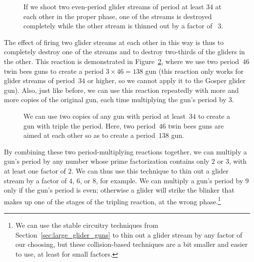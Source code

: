 \begin{figure}[!htb]
	\centering
	\caption{If we shoot two even-period glider streams of period at least $34$ at each other in the proper phase, one of the streams is destroyed completely while the other stream is thinned out by a factor of ~$3$.}\label{fig:glider_delete2}
\end{figure}

The effect of firing two glider streams at each other in this way is thus to completely destroy one of the streams and to destroy two-thirds of the gliders in the other. This reaction is demonstrated in Figure~\ref{fig:p138_gun}, where we use two period~$46$ twin bees guns to create a period $3 \times 46 = 138$ gun (this reaction only works for glider streams of period~$34$ or higher, so we cannot apply it to the Gosper glider gun). Also, just like before, we can use this reaction repeatedly with more and more copies of the original gun, each time multiplying the gun's period by $3$.

\begin{figure}[!htb]
	\centering
	\caption{We can use two copies of any gun with period at least~$34$ to create a gun with triple the period. Here, two period~$46$ twin bees guns are aimed at each other so as to create a period~$138$ gun.}\label{fig:p138_gun}
\end{figure}

By combining these two period-multiplying reactions together, we can multiply a gun's period by any number whose prime factorization contains only $2$ or $3$, with at least one factor of $2$. We can thus use this technique to thin out a glider stream by a factor of $4$, $6$, or $8$, for example. We can multiply a gun's period by $9$ only if the gun's period is even; otherwise a glider will strike the blinker that makes up one of the stages of the tripling reaction, at the wrong phase.\footnote{We can use the stable circuitry techniques from Section~\ref{sec:large_glider_guns} to thin out a glider stream by any factor of our choosing, but these collision-based techniques are a bit smaller and easier to use, at least for small factors.}

